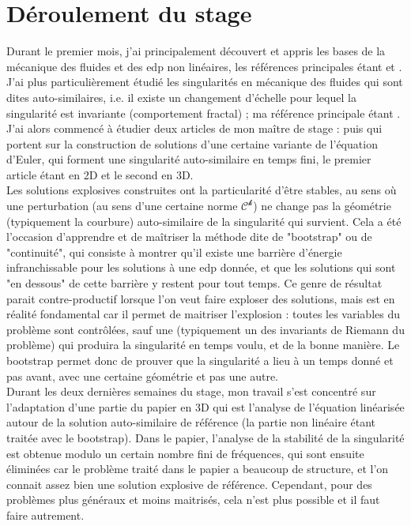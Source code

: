 \documentclass[12pt,a4paper]{article}
\begin{document}
\section{Déroulement du stage}
Durant le premier mois, j'ai principalement découvert et appris les bases de la mécanique des fluides et des edp non linéaires, les références principales étant \cite{majda2001vorticity} et \cite{tao2006dispersive}. J'ai plus particulièrement étudié les singularités en mécanique des fluides qui sont dites auto-similaires, i.e. il existe un changement d'échelle pour lequel la singularité est invariante (comportement fractal) ; ma référence principale étant \cite{eggers2015singularities}. J'ai alors commencé à étudier deux articles de mon maître de stage : \cite{buckmaster2019formation} puis \cite{buckmaster2022imploding} qui portent sur la construction de solutions d'une certaine variante de l'équation d'Euler, qui forment une singularité auto-similaire en temps fini, le premier article étant en 2D et le second en 3D. \\
Les solutions explosives construites ont la particularité d'être stables, au sens où une perturbation (au sens d'une certaine norme $\mathcal{C^k}$) ne change pas la géométrie (typiquement la courbure) auto-similaire de la singularité qui survient. Cela a été l'occasion d'apprendre et de maîtriser la méthode dite de "bootstrap" ou de "continuité", qui consiste à montrer qu'il existe une barrière d'énergie infranchissable pour les solutions à une edp donnée, et que les solutions qui sont "en dessous" de cette barrière y restent pour tout temps. Ce genre de résultat parait contre-productif lorsque l'on veut faire exploser des solutions, mais est en réalité fondamental car il permet de maitriser l'explosion : toutes les variables du problème sont contrôlées, sauf une (typiquement un des invariants de Riemann du problème) qui produira la singularité en temps voulu, et de la bonne manière. Le bootstrap permet donc de prouver que la singularité a lieu à un temps donné et pas avant, avec une certaine géométrie et pas une autre. \\
Durant les deux dernières semaines du stage, mon travail s'est concentré sur l'adaptation d'une partie du papier en 3D qui est l'analyse de l'équation linéarisée autour de la solution auto-similaire de référence (la partie non linéaire étant traitée avec le bootstrap). Dans le papier, l'analyse de la stabilité de la singularité est obtenue modulo un certain nombre fini de fréquences, qui sont ensuite éliminées car le problème traité dans le papier a beaucoup de structure, et l'on connait assez bien une solution explosive de référence. Cependant, pour des problèmes plus généraux et moins maitrisés, cela n'est plus possible et il faut faire autrement.\\
\end{document}
